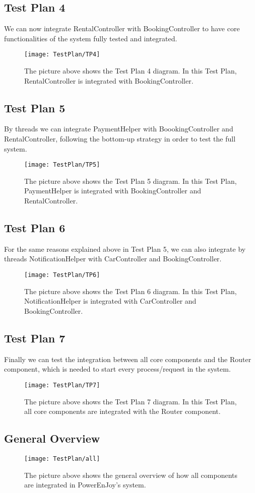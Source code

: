 \subsection{Test Plan 4}
We can now integrate RentalController with BookingController to have core functionalities of the system fully tested and integrated.
\begin{figure}[H]
	\centering
	\texttt{[image: TestPlan/TP4]}
	\caption[Test Plan 4 diagram]{The picture above shows the Test Plan 4 diagram. In this Test Plan, RentalController is integrated with BookingController.}
	\label{fig:TestPlan-4}
\end{figure}

\subsection{Test Plan 5}
By threads we can integrate PaymentHelper with BoookingController and RentalController, following the bottom-up strategy in order to test the full system.
\begin{figure}[H]
	\centering
	\texttt{[image: TestPlan/TP5]}
	\caption[Test Plan 5 diagram]{The picture above shows the Test Plan 5 diagram. In this Test Plan, PaymentHelper is integrated with BookingController and RentalController.}
	\label{fig:TestPlan-5}
\end{figure}

\subsection{Test Plan 6}
For the same reasons explained above in Test Plan 5, we can also integrate by threads NotificationHelper with CarController and BookingController.
\begin{figure}[H]
	\centering
	\texttt{[image: TestPlan/TP6]}
	\caption[Test Plan 6 diagram]{The picture above shows the Test Plan 6 diagram. In this Test Plan, NotificationHelper is integrated with CarController and BookingController.}
	\label{fig:TestPlan-6}
\end{figure}

\subsection{Test Plan 7}
Finally we can test the integration between all core components and the Router component, which is needed to start every process/request in the system.
\begin{figure}[H]
	\centering
	\texttt{[image: TestPlan/TP7]}
	\caption[Test Plan 7 diagram]{The picture above shows the Test Plan 7 diagram. In this Test Plan, all core components are integrated with the Router component.}
	\label{fig:TestPlan-7}
\end{figure}

\subsection{General Overview}
\begin{figure}[H]
	\centering
	\texttt{[image: TestPlan/all]}
	\caption[General Overview diagram]{The picture above shows the general overview of how all components are integrated in PowerEnJoy's system.}
	\label{fig:General Overview}
\end{figure}
